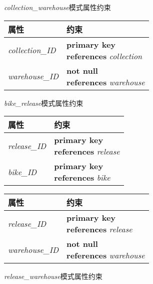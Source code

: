   \begin{figure}[!htp]
    \begin{minipage}{0.3\textwidth}
      \centering
      \caption{\textit{collection\_warehouse}模式属性约束}
      \label{tab:ccollectionwarehouse}
      \begin{tabular}{ll}\toprule
        属性&约束\\\midrule
       \textit{collection\_ID}&\makecell[l]{\textbf{primary key}\\\textbf{references} \textit{collection}}\\
       \textit{warehouse\_ID}&\makecell[l]{\textbf{not null}\\\textbf{references} \textit{warehouse}}\\
       \bottomrule
      \end{tabular}
    \end{minipage}\hfill
    \begin{minipage}{0.3\textwidth}
      \centering
      \caption{\textit{bike\_release}模式属性约束}
      \label{tab:cbikerelease}
      \begin{tabular}{ll}\toprule
        属性&约束\\\midrule
       \textit{release\_ID}&\makecell[l]{\textbf{primary key}\\\textbf{references} \textit{release}}\\
       \textit{bike\_ID}&\makecell[l]{\textbf{primary key}\\\textbf{references} \textit{bike}}\\
       \bottomrule
      \end{tabular}
    \end{minipage}\hfill
    \begin{minipage}{0.3\textwidth}
      \centering
      \caption{\textit{release\_warehouse}模式属性约束}
      \label{tab:creleasewarehouse}
      \begin{tabular}{ll}\toprule
        属性&约束\\\midrule
       \textit{release\_ID}&\makecell[l]{\textbf{primary key}\\\textbf{references} \textit{release}}\\
       \textit{warehouse\_ID}&\makecell[l]{\textbf{not null}\\\textbf{references} \textit{warehouse}}\\
       \bottomrule
      \end{tabular}
    \end{minipage}\hfill
  \end{figure}
